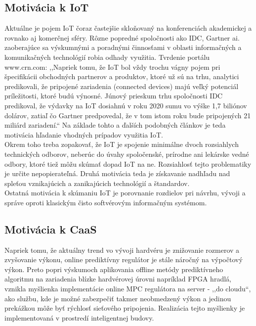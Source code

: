 \subsection*{Motivácia k IoT}
Aktuálne je pojem IoT čoraz častejšie skloňovaný na konferenciách akademickej a rovnako aj komerčnej sféry. Rôzne popredné spoločnosti ako IDC, Gartner ai. zaoberajúce sa výskumnými a poradnými činnosťami v oblasti informačných a komunikačných technológií robia odhady využitia. Tvrdenie portálu www.crn.com:
,,Napriek tomu, že IoT bol vždy trochu vágny pojem pri špecifikácii obchodných partnerov a produktov, ktoré už sú na trhu, analytici predikovali, že pripojené zariadenia (connected devices) majú veľký potenciál príležitosti, ktoré budú výnosné. Júnový prieskum trhu spoločnosti IDC predikoval, že výdavky na IoT dosiahnú v roku 2020 sumu vo výške 1,7 biliónov dolárov, zatiaľ čo Gartner predpovedal, že v tom istom roku bude pripojených 21 miliárd zariadení.``\cite{IOT01} Na základe tohto a ďalších podobných článkov je teda motivácia hľadanie vhodných prípadov využitia IoT.\\
\indent Okrem toho treba zopakovať, že IoT je spojenie minimálne dvoch rozsiahlych technických odborov, neberúc do úvahy spoločenské, prírodne ani lekárske vedné odbory, ktoré tiež môžu skúmať dopad IoT na ne. Rozsiahlosť tejto problematiky je určite nepopierateľná. Druhá motivácia teda je získavanie  nadhľadu nad spleťou vznikajúcich a zanikajúcich technológií a štandardov.\\
\indent Ostatná motivácia k skúmaniu IoT je porovnanie rozdielov pri návrhu, vývoji a správe oproti klasickým čisto softvérovým informačným systémom. 
\subsection*{Motivácia k CaaS}
Napriek tomu, že aktuálny trend vo vývoji hardvéru je znižovanie rozmerov a  zvyšovanie výkonu, online prediktívny regulátor je stále náročný na výpočtový výkon. Preto popri výskumoch aplikovania offline metódy prediktívneho algoritmu na zariadenia blízke hardvérovej úrovni napríklad FPGA hradlá, vznikla myšlienka implementácie online MPC regulátora na server - ,,do cloudu``, ako službu, kde je možné zabezpečiť takmer neobmedzený výkon a jedinou prekážkou môže byť rýchlosť sieťového pripojenia. Realizácia tejto myšlienky je implementovaná v prostredí inteligentnej budovy.